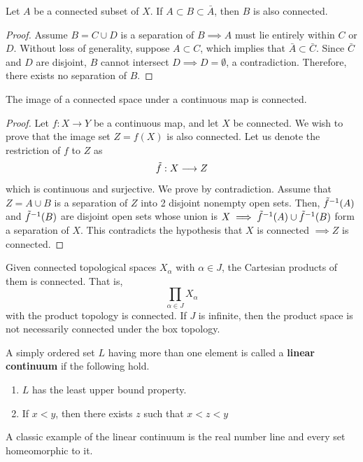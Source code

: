     \begin{theorem}
    Let $A$ be a connected subset of $X$. If $A \subset B \subset \bar{A}$, then $B$ is also connected. 
    \end{theorem}
    \begin{proof}
    Assume $B = C \cup D$ is a separation of $B \implies A$ must lie entirely within $C$ or $D$. Without loss of generality, suppose $A \subset C$, which implies that $\bar{A} \subset \bar{C}$. Since $\bar{C}$ and $D$ are disjoint, $B$ cannot intersect $D \implies D = \emptyset$, a contradiction. Therefore, there exists no separation of $B$. 
    \end{proof}

    \begin{theorem}
    The image of a connected space under a continuous map is connected. 
    \end{theorem}
    \begin{proof}
    Let $f: X \longrightarrow Y$ be a continuous map, and let $X$ be connected. We wish to prove that the image set $Z = f(X)$ is also connected. Let us denote the restriction of $f$ to $Z$ as
    \[\Tilde{f}: X \longrightarrow Z\]
    which is continuous and surjective. We prove by contradiction. Assume that $Z = A \cup B$ is a separation of $Z$ into 2 disjoint nonempty open sets. Then, $\Tilde{f}^{-1} (A)$ and $\Tilde{f}^{-1}(B)$ are disjoint open sets whose union is $X \implies \Tilde{f}^{-1} (A) \cup \Tilde{f}^{-1}(B)$ form a separation of $X$. This contradicts the hypothesis that $X$ is connected $\implies Z$ is connected.  
    \end{proof}

    \begin{theorem}
    Given connected topological spaces $X_\alpha$ with $\alpha \in J$, the Cartesian products of them is connected. That is, 
    \[\prod_{\alpha \in J} X_\alpha\]
    with the product topology is connected. If $J$ is infinite, then the product space is not necessarily connected under the box topology. 
    \end{theorem}

    \begin{definition}
    A simply ordered set $L$ having more than one element is called a \textbf{linear continuum} if the following hold. 
    \begin{enumerate}
        \item $L$ has the least upper bound property. 
        \item If $x <y$, then there exists $z$ such that $x<z<y$
    \end{enumerate}
    A classic example of the linear continuum is the real number line and every set homeomorphic to it. 
    \end{definition}

